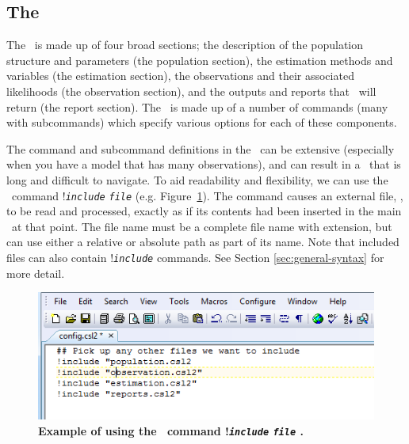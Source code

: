 \subsection{The \config\label{sec:config-files}}

The \config\ is made up of four broad sections; the description of the population structure and parameters (the population section), the estimation methods and variables (the estimation section), the observations and their associated likelihoods (the observation section), and the outputs and reports that \CNAME\ will return (the report section). The \config\ is made up of a number of commands (many with subcommands) which specify various options for each of these components.

The command and subcommand definitions in the \config\ can be extensive (especially when you have a model that has many observations), and can result in a \config\ that is long and difficult to navigate. To aid readability and flexibility, we can use the \config\ command !\texttt{\emph{include}} \texttt{\emph{file}}  (e.g. Figure~\ref{fig:config_file_1}). The command causes an external file, , to be read and processed, exactly as if its contents had been inserted in the main \config\ at that point. The file name must be a complete file name with extension, but can use either a relative or absolute path as part of its name. Note that included files can also contain !\texttt{\emph{include}} commands. See Section \ref{sec:general-syntax} for more detail.


\vspace*{3mm}
\begin{figure}[htp]
	\includegraphics[scale=1]{Figures/config.png}
	\caption{\textbf{Example of using the \config\ command !\texttt{\emph{include}}
	 \texttt{\emph{file}} .}}\label{fig:config_file_1}
\end{figure}

